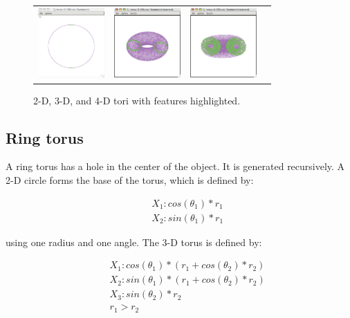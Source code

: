 \begin{figure}[ht]
\centering
\begin{tabular}{c c c c}
\includegraphics[width=1in]{fig/torus-2-50k.pdf} & \includegraphics[width=1in]{fig/torus-3-50k.pdf} & \includegraphics[width=1in]{fig/torus-4-50k.pdf}
\end{tabular}
\caption{2-D, 3-D, and 4-D tori with features highlighted.}
\end{figure}

\subsection{Ring torus}

A ring torus has a hole in the center of the object. It is generated
recursively. A 2-D circle forms the base of the torus, which is defined by:

\begin{eqnarray*}
&&X_1: cos(\theta_1) * r_1\\
&&X_2: sin(\theta_1) * r_1
\end{eqnarray*}

\noindent using one radius and one angle. The 3-D torus is defined by:

\begin{eqnarray*}
&&X_1: cos(\theta_1) * (r_1 + cos(\theta_2) * r_2)\\
&&X_2: sin(\theta_1) * (r_1 + cos(\theta_2) * r_2)\\
&&X_3: sin(\theta_2) * r_2\\
&&r_1 > r_2
\end{eqnarray*}

